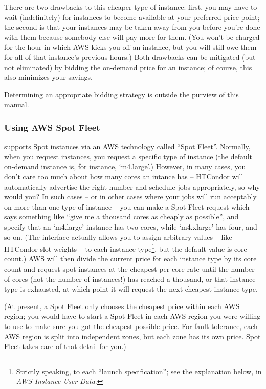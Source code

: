 There are two drawbacks to this cheaper type of instance: first,
you may have to wait (indefinitely) for instances to become available at
your preferred price-point; the second is that your instances may be taken
away from you before you're done with them because somebody else will pay
more for them.  (You won't be charged for the hour in which AWS kicks
you off an instance, but you will still owe them for all of that instance's
previous hours.)  Both drawbacks can be mitigated (but not eliminated) by
bidding the on-demand price for an instance; of course, this also minimizes
your savings.

Determining an appropriate bidding strategy is outside the purview of
this manual.

\subsubsection{Using AWS Spot Fleet}

 supports Spot instances via an AWS technology called
``Spot Fleet''.  Normally, when you request instances, you request a specific
type of instance (the default on-demand instance is, for instance, `m4.large'.)
However, in many cases, you don't care too much about how many cores an
intance has -- HTCondor will automatically advertise the right number and
schedule jobs appropriately, so why would you?  In such cases -- or in
other cases where your jobs will run acceptably on more than one type of
instance -- you can make a Spot Fleet request which says something like
``give me a thousand cores as cheaply as possible'', and specify that
an `m4.large' instance has two cores, while `m4.xlarge' has four, and so
on.  (The interface actually allows you to assign arbitrary values --
like HTCondor slot weights -- to each instance
type\footnote{Strictly speaking, to each ``launch specification''; see
the explanation below, in \emph{AWS Instance User Data}.},
but the default value is core count.)  AWS will then divide the current price for each
instance type by its core count and request spot instances at the cheapest
per-core rate until the number of cores (not the number of instances!) has
reached a thousand, or that instance type is exhausted, at which point it will
request the next-cheapest instance type.

(At present, a Spot Fleet only chooses the cheapest price within each
AWS region; you would have to start a Spot Fleet in each AWS region you
were willing to use to make sure you got the cheapest possible price.  For
fault tolerance, each AWS region is split into independent zones, but each
zone has its own price.  Spot Fleet takes care of that detail for you.)

